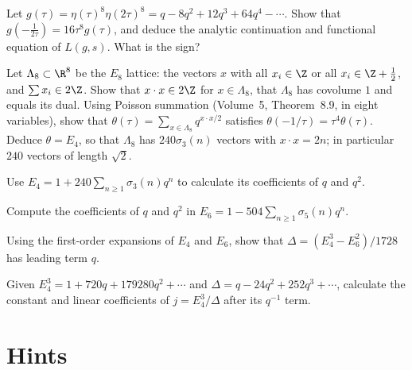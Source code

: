 \begin{exercise}[$\star\star$]\label{ex:level2}
Let $g(\tau)=\eta(\tau)^8\eta(2\tau)^8=q-8q^2+12q^3+64q^4-\cdots$. Show that $g(-\frac1{2\tau})=16\tau^8g(\tau)$, and deduce the analytic continuation and functional equation
of $L(g,s)$. What is the sign?
\end{exercise}

\begin{exercise}[$\star\star\star$]\label{ex:e8theta}
Let $\Lambda_8\subset\R^8$ be the $E_8$ lattice: the vectors $x$ with all $x_i\in\Z$ or all $x_i\in\Z+\frac12$, and $\sum x_i\in2\Z$. Show that $x\cdot x\in2\Z$ for
$x\in\Lambda_8$, that $\Lambda_8$ has covolume $1$ and equals its dual. Using Poisson summation (Volume~5, Theorem~8.9, in eight variables), show that
$\theta(\tau)=\sum_{x\in\Lambda_8}q^{x\cdot x/2}$ satisfies $\theta(-1/\tau)=\tau^4\theta(\tau)$. Deduce $\theta=E_4$, so that $\Lambda_8$ has $240\sigma_3(n)$ vectors with
$x\cdot x=2n$; in particular $240$ vectors of length $\sqrt2$.
\end{exercise}

\begin{exercise}[$\star$]\label{ex:v13-extra-17-1}
Use $E_4=1+240\sum_{n\ge1}\sigma_3(n)q^n$ to calculate its coefficients of $q$ and $q^2$.
\end{exercise}

\begin{exercise}[$\star$]\label{ex:v13-extra-17-2}
Compute the coefficients of $q$ and $q^2$ in $E_6=1-504\sum_{n\ge1}\sigma_5(n)q^n$.
\end{exercise}

\begin{exercise}[$\star\star$]\label{ex:v13-extra-17-3}
Using the first-order expansions of $E_4$ and $E_6$, show that $\Delta=(E_4^3-E_6^2)/1728$ has leading term $q$.
\end{exercise}

\begin{exercise}[$\star\star$]\label{ex:v13-extra-17-4}
Given $E_4^3=1+720q+179280q^2+\cdots$ and $\Delta=q-24q^2+252q^3+\cdots$, calculate the constant and linear coefficients of $j=E_4^3/\Delta$ after its $q^{-1}$ term.
\end{exercise}

\section{Hints}

